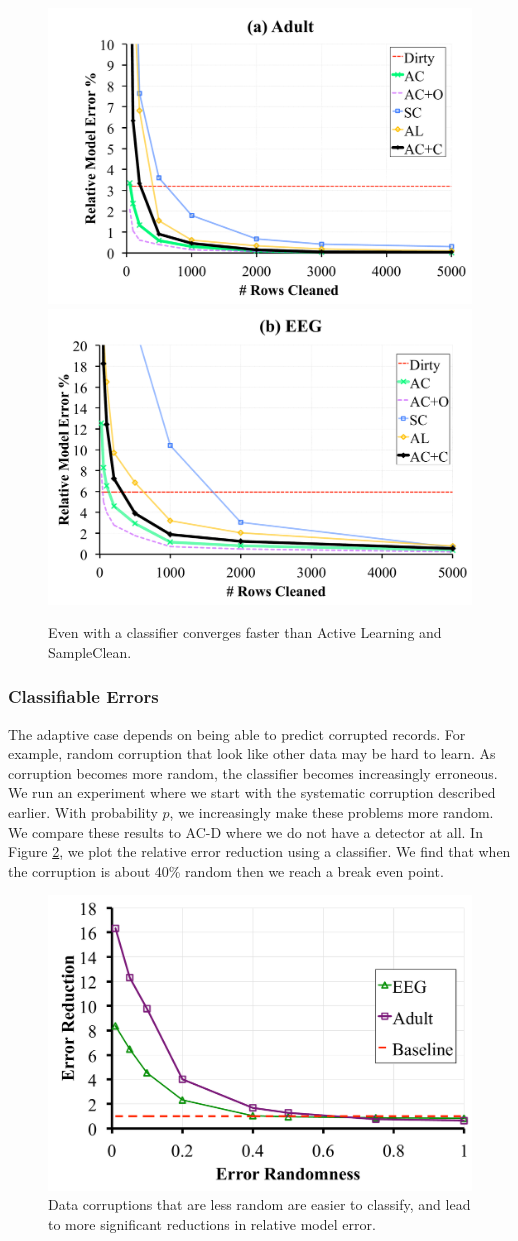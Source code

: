 \begin{figure}[t]
\centering
 \includegraphics[width=0.49\columnwidth]{exp/exp11a.pdf}
 \includegraphics[width=0.49\columnwidth]{exp/exp11b.pdf}
 \caption{Even with a classifier \sys converges faster than Active Learning and SampleClean. \label{pred-perf}}
\end{figure}

\subsubsection{Classifiable Errors}
The adaptive case depends on being able to predict corrupted records.
For example, random corruption that look like other data may be hard to learn.
As corruption becomes more random, the classifier becomes increasingly erroneous.
We run an experiment where we start with the systematic corruption described earlier.
With probability $p$, we increasingly make these problems more random.
We compare these results to AC-D where we do not have a detector at all.
In Figure \ref{tradeoffs2}, we plot the relative error reduction using a classifier.
We find that when the corruption is about 40\% random then we reach a break even point.

\begin{figure}[ht!]
\vspace{-1em}
\centering
 \includegraphics[width=0.5\columnwidth]{exp/exp5a.pdf}
 \caption{Data corruptions that are less random are easier to classify, and lead to more significant reductions in relative model error. \label{tradeoffs2}}
\end{figure}

